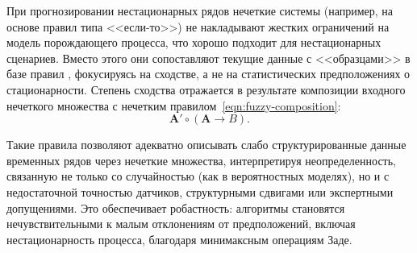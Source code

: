 При прогнозировании нестационарных рядов нечеткие системы (например, на основе правил типа <<если-то>>) не накладывают жестких ограничений на модель порождающего процесса, что хорошо подходит для нестационарных сценариев. Вместо этого они сопоставляют текущие данные с <<образцами>> в базе правил \cite{Song1993, Chen1996, Lucas2021, BoseMali2019, Pekaslan2020, Pourabdollah2017, FuzzyMacroForecast, FuzzyFinanceTS, YarushevNeuroFuzzyTS, PetukhovaFCMForecast}, фокусируясь на сходстве, а не на статистических предположениях о стационарности. Степень сходства отражается в результате композиции входного нечеткого множества с нечетким правилом~\eqref{eqn:fuzzy-composition}:
\begin{equation}
\label{eqn:fuzzy-composition}
\mathbf{A'} \circ \left(\mathbf{A} \rightarrow B\right).
\end{equation}

Такие правила позволяют адекватно описывать слабо структурированные данные временных рядов через нечеткие множества, интерпретируя неопределенность, связанную не только со случайностью (как в вероятностных моделях), но и с недостаточной точностью датчиков, структурными сдвигами или экспертными допущениями. Это обеспечивает робастность: алгоритмы становятся нечувствительными к малым отклонениям от предположений, включая нестационарность процесса, благодаря минимаксным операциям Заде.


